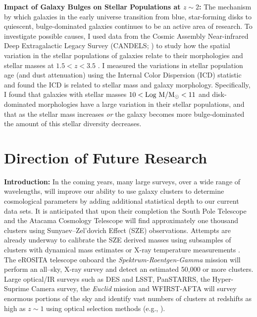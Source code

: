 \documentclass[overlapped, line, 11pt]{res}
\newcommand{\Msol}{\hbox{$\mathrm{M}_\odot$}}
\newcommand{\eg}{e.g.}
\newcommand{\citeeg}[1]{(\eg, \citealt{#1})}
\begin{document}
\begin{resume}
\noindent \textbf{Impact of Galaxy Bulges on Stellar Populations at $z\sim2$:} The mechanism by which galaxies in the early universe transition from blue, star-forming disks to quiescent, bulge-dominated galaxies continues to be an active area of research. To investigate possible causes, I used data from the Cosmic Assembly Near-infrared Deep Extragalactic Legacy Survey (CANDELS; \citealt{Koekemoer2011, Grogin2011}) to study how the spatial variation in the stellar populations of galaxies relate to their morphologies and stellar masses at $1.5 < z < 3.5$ \citep{Boada2015}. I measured the variations in stellar population age (and dust attenuation) using the Internal Color Dispersion (ICD) statistic and found the ICD is related to stellar mass and galaxy morphology. Specifically, I found that galaxies with stellar masses $10<\mathrm{Log~M}/\Msol<11$ and disk-dominated morphologies have a large variation in their stellar populations, and that as the stellar mass increases \emph{or} the galaxy becomes more bulge-dominated the amount of this stellar diversity decreases.

\section{\sc Direction of Future Research}
\noindent \textbf{Introduction:} In the coming years, many large surveys, over a wide range of wavelengths, will improve our ability to use galaxy clusters to determine cosmological parameters by adding additional statistical depth to our current data sets. It is anticipated that upon their completion the South Pole Telescope and the Atacama Cosmology Telescope will find approximately one thousand clusters using Sunyaev--Zel’dovich Effect (SZE) observations. Attempts are already underway to calibrate the SZE derived masses using subsamples of clusters with dynamical mass estimates or X-ray temperature measurements \citep{Sifon2013, Bocquet2015}. The eROSITA telescope onboard the \emph{Spektrum-Roentgen-Gamma} mission will perform an all--sky, X-ray survey and detect an estimated 50,000 or more clusters. Large optical/IR surveys such as DES and LSST, PanSTARRS, the Hyper-Suprime Camera survey, the \emph{Euclid} mission and WFIRST-AFTA will survey enormous portions of the sky and identify vast numbers of clusters at redshifts as high as $z\sim1$ using optical selection methods \citeeg{Rykoff2012, Rozo2015a}.


\end{resume}
\end{document}
